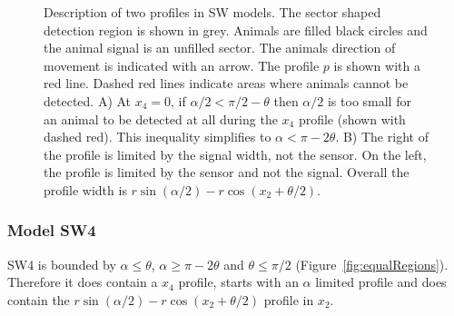 \begin{figure}[t]
 \centering
{
}
\caption[Description of two profiles in SW models]{
Description of two profiles in SW models.
The sector shaped detection region is shown in grey.
Animals are filled black circles and the animal signal is an unfilled sector.
The animals direction of movement is indicated with an arrow.
The profile $p$ is shown with a red line.
Dashed red lines indicate areas where animals cannot be detected.
A) At $x_4 = 0$, if $\alpha/2 < \pi/2 - \theta$ then $\alpha/2$ is too small for an animal to be detected at all during the $x_4$ profile (shown with dashed red).
This inequality simplifies to $\alpha < \pi - 2\theta$.
B) The right of the profile is limited by the signal width, not the sensor.
On the left, the profile is limited by the sensor and not the signal.
Overall the profile width is $r\sin(\alpha/2) - r\cos(x_2 + \theta/2)$.
}
\label{fig:SW4--9}
\end{figure}

\subsubsection{Model SW4} \label{SW4}

SW4 is bounded by $\alpha \le \theta$, $\alpha \ge \pi - 2\theta$ and $\theta \le \pi/2$ (Figure~\ref{fig:equalRegions}).
Therefore it does contain a $x_4$ profile, starts with an $\alpha$ limited profile and does contain the $r\sin(\alpha/2) - r\cos(x_2 + \theta/2)$ profile in $x_2$.

